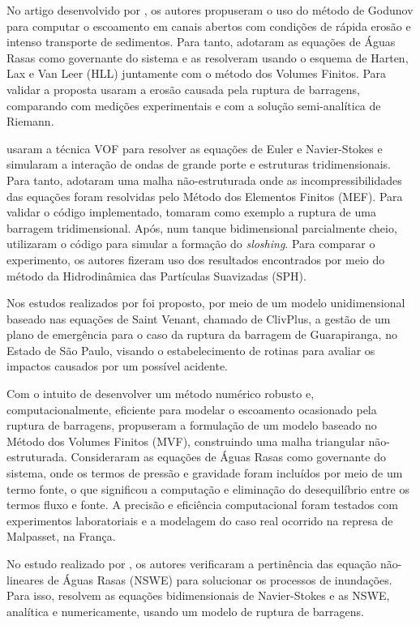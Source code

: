 No artigo desenvolvido por , os autores propuseram o uso do método de Godunov para computar o escoamento em canais abertos com condições de rápida erosão e intenso transporte de sedimentos. Para tanto, adotaram as equações de Águas Rasas como governante do sistema e as resolveram usando o esquema de Harten, Lax e Van Leer (HLL) juntamente com o método dos Volumes Finitos. Para validar a proposta usaram a erosão causada pela ruptura de barragens, comparando com medições experimentais e com  a solução semi-analítica de Riemann.

 usaram a técnica VOF para resolver as equações de Euler e Navier-Stokes e simularam a interação de ondas de grande porte e estruturas tridimensionais. Para tanto, adotaram uma malha não-estruturada onde as incompressibilidades das equações foram resolvidas pelo Método dos Elementos Finitos (MEF). Para validar o código implementado, tomaram como exemplo a ruptura de uma barragem tridimensional. Após, num tanque bidimensional parcialmente cheio, utilizaram o código para simular a formação do \textit{sloshing}. Para comparar o experimento, os autores fizeram uso dos resultados encontrados por meio do método da Hidrodinâmica das Partículas Suavizadas (SPH). 

Nos estudos realizados por  foi proposto, por meio de um modelo unidimensional  baseado nas equações de Saint Venant, chamado de ClivPlus, a gestão de um plano de emergência para o caso da ruptura da barragem de Guarapiranga, no Estado de São Paulo, visando o estabelecimento de rotinas para avaliar os impactos causados por um possível acidente.

Com o intuito de desenvolver um método numérico robusto e, computacionalmente, eficiente para modelar o escoamento ocasionado pela ruptura de barragens,  propuseram a formulação de um modelo baseado no Método dos Volumes Finitos (MVF), construindo uma malha triangular não-estruturada. Consideraram as equações de Águas Rasas como governante  do sistema, onde os termos de pressão e gravidade foram incluídos por meio de um termo fonte, o que significou a computação  e eliminação do desequilíbrio entre os termos fluxo e fonte. A precisão e eficiência computacional foram testados com experimentos laboratoriais e a modelagem do caso real ocorrido na represa de Malpasset, na França.

No estudo realizado por , os autores verificaram a pertinência das equação não-lineares de Águas Rasas (NSWE) para solucionar os processos de inundações. Para isso, resolvem as equações bidimensionais de Navier-Stokes e as NSWE, analítica e numericamente, usando um modelo de ruptura de barragens.

